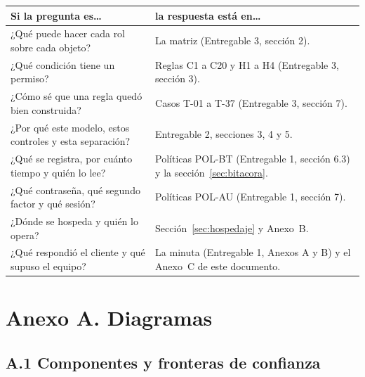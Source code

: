 \documentclass[11pt,letterpaper]{article}
\newcommand{\cab}[1]{\textbf{\rmfamily #1}}
\begin{document}
\begin{center}
\small
\renewcommand{\arraystretch}{1.13}
\begin{tabularx}{\textwidth}{@{}L{7.4cm} Y@{}}
\toprule
\cab{Si la pregunta es\ldots} & \cab{la respuesta está en\ldots} \\
\midrule
¿Qué puede hacer cada rol sobre cada objeto? & La matriz (Entregable 3, sección 2). \\
¿Qué condición tiene un permiso? & Reglas C1 a C20 y H1 a H4 (Entregable 3, sección 3). \\
¿Cómo sé que una regla quedó bien construida? & Casos T-01 a T-37 (Entregable 3, sección 7). \\
¿Por qué este modelo, estos controles y esta separación? & Entregable 2, secciones 3, 4 y 5. \\
¿Qué se registra, por cuánto tiempo y quién lo lee? & Políticas POL-BT (Entregable 1, sección 6.3) y la sección~\ref{sec:bitacora}. \\
¿Qué contraseña, qué segundo factor y qué sesión? & Políticas POL-AU (Entregable 1, sección 7). \\
¿Dónde se hospeda y quién lo opera? & Sección~\ref{sec:hospedaje} y Anexo~B. \\
¿Qué respondió el cliente y qué supuso el equipo? & La minuta (Entregable 1, Anexos A y B) y el Anexo~C de este documento. \\
\bottomrule
\end{tabularx}
\end{center}

\clearpage
\section*{Anexo A. Diagramas}

\subsection*{A.1 Componentes y fronteras de confianza}
\end{document}
